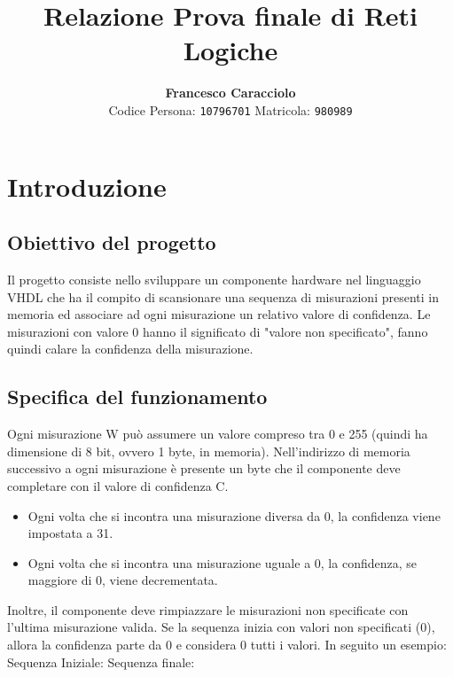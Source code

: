 \documentclass[12pt,a4paper]{scrartcl}
\title{Relazione Prova finale di Reti Logiche}
\author{
    \textbf{Francesco Caracciolo} \\
    \small{Codice Persona: \texttt{10796701}} \small{Matricola: \texttt{980989}}
}
\date{}
\begin{document}
\maketitle
\tableofcontents
\newpage
\section{Introduzione}
\subsection{Obiettivo del progetto}
Il progetto consiste nello sviluppare un componente hardware nel linguaggio VHDL che ha il compito di scansionare una sequenza di misurazioni presenti in memoria ed associare ad ogni misurazione un relativo valore di confidenza. \newline
Le misurazioni con valore 0 hanno il significato di "valore non specificato", fanno quindi calare la confidenza della misurazione.
\subsection{Specifica del funzionamento}
Ogni misurazione W può assumere un valore compreso tra 0 e 255 (quindi ha dimensione di 8 bit, ovvero 1 byte, in memoria).
\newline Nell'indirizzo di memoria successivo a ogni misurazione è presente un byte che il componente deve completare con il valore di confidenza C.
\begin{itemize}
    \item Ogni volta che si incontra una misurazione diversa da 0, la confidenza viene impostata a 31.
    \item Ogni volta che si incontra una misurazione uguale a 0, la confidenza, se maggiore di 0, viene decrementata.
\end{itemize}
Inoltre, il componente deve rimpiazzare le misurazioni non specificate con l'ultima misurazione valida. Se la sequenza inizia con valori non specificati (0), allora la confidenza parte da 0 e considera 0 tutti i valori.\newline
In seguito un esempio:
\newline Sequenza Iniziale: \newline
[\textcolor{ForestGreen}{177}, \textcolor{gray}{0}, \textcolor{ForestGreen}{109}, \textcolor{gray}{0}, \textcolor{ForestGreen}{249}, \textcolor{gray}{0}, \textcolor{red}{0}, \textcolor{gray}{0}, \textcolor{red}{0}, \textcolor{gray}{0}, \textcolor{red}{0}, \textcolor{gray}{0}, \textcolor{ForestGreen}{102}, \textcolor{gray}{0}, \textcolor{red}{0}, \textcolor{gray}{0}]
\newline Sequenza finale: 
\end{document}
